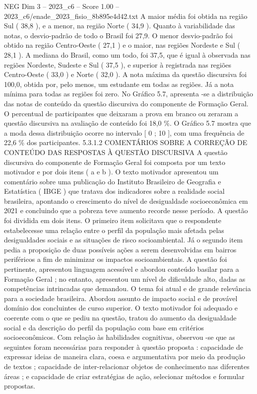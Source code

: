 \begin{textsample}{NEG Dim 3 – 2023\_c6 – Score 1.00 – 2023\_c6/enade\_2023\_fisio\_8b895e4d42.txt}
A maior média foi obtida na região Sul ( 38,8 ), e a menor, na região Norte ( 34,9 ).
Quanto à variabilidade das notas, o desvio-padrão de todo o Brasil foi 27,9.
O menor desvio-padrão foi obtido na região Centro-Oeste ( 27,1 ) e o maior, nas regiões Nordeste e Sul ( 28,1 ).
A mediana do Brasil, como um todo, foi 37,5, que é igual à observada nas regiões Nordeste, Sudeste e Sul ( 37,5 ), e superior à registrada nas regiões Centro-Oeste ( 33,0 ) e Norte ( 32,0 ).
A nota máxima da questão discursiva foi 100,0, obtida por, pelo menos, um estudante em todas as regiões.
Já a nota mínima para todas as regiões foi zero.
No Gráfico 5.7, apresenta -se a distribuição das notas de conteúdo da questão discursiva do componente de Formação Geral.
O percentual de participantes que deixaram a prova em branco ou zeraram a questão discursiva na avaliação de conteúdo foi 18,0 \%.
O Gráfico 5.7 mostra que a moda dessa distribuição ocorre no intervalo [ 0 ; 10 ], com uma frequência de 22,6 \% dos participantes. 5.3.1.2 COMENTÁRIOS SOBRE A CORREÇÃO DE CONTEÚDO DAS RESPOSTAS À QUESTÃO DISCURSIVA A questão discursiva do componente de Formação Geral foi composta por um texto motivador e por dois itens ( a e b ).
O texto motivador apresentou um comentário sobre uma publicação do Instituto Brasileiro de Geografia e Estatística ( IBGE ) que tratava dos indicadores sobre a realidade social brasileira, apontando o crescimento do nível de desigualdade socioeconômica em 2021 e concluindo que a pobreza teve aumento recorde nesse período.
A questão foi dividida em dois itens.
O primeiro item solicitava que o respondente estabelecesse uma relação entre o perfil da população mais afetada pelas desigualdades sociais e as situações de risco socioambiental.
Já o segundo item pedia a proposição de duas possíveis ações a serem desenvolvidas em bairros periféricos a fim de minimizar os impactos socioambientais.
A questão foi pertinente, apresentou linguagem acessível e abordou conteúdo basilar para a Formação Geral ; no entanto, apresentou um nível de dificuldade alto, dadas as competências intrincadas que demandou.
O tema foi atual e de grande relevância para a sociedade brasileira.
Abordou assunto de impacto social e de provável domínio dos concluintes de curso superior.
O texto motivador foi adequado e coerente com o que se pediu na questão, tratou do aumento da desigualdade social e da descrição do perfil da população com base em critérios socioeconômicos.
Com relação às habilidades cognitivas, observou -se que as seguintes foram necessárias para responder à questão proposta : capacidade de expressar ideias de maneira clara, coesa e argumentativa por meio da produção de textos ; capacidade de inter-relacionar objetos de conhecimento nas diferentes áreas ; e capacidade de criar estratégias de ação, selecionar métodos e formular propostas.

\end{textsample}

